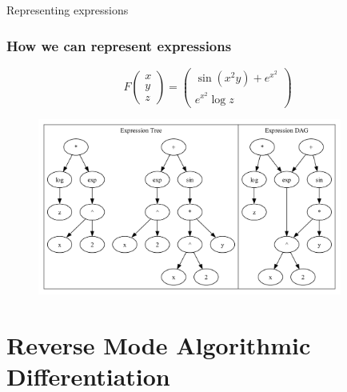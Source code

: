 \documentclass{beamer}
\begin{document}
\begin{frame}{Representing expressions}
    \frametitle{How we can represent expressions}
    \begin{equation*} \label{example1}
        F \begin{pmatrix}
            x \\ y \\ z
        \end{pmatrix} = \begin{pmatrix}
            \sin (x^2 y) + e^{x^2} \\ e^{x^2} \log z
        \end{pmatrix}
    \end{equation*}
    \begin{figure}
        \centering
        \includegraphics[width=10cm]{images/Graph_Cluster_1.pdf}
        \caption{}
        \label{fig:clusterdag}
    \end{figure}
\end{frame}



\section{Reverse Mode Algorithmic Differentiation}
\end{document}
